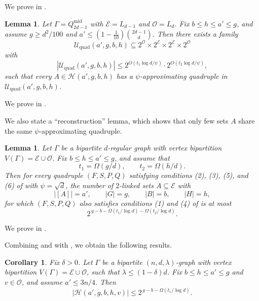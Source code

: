 \documentclass{amsart}
\newtheorem{cor}[thm]{Corollary}
\newtheorem{lem}[thm]{Lemma}
\theoremstyle{definition}
\newcommand{\cO}{\mathcal{O} }
\newcommand{\cE}{\mathcal{E} }
\newcommand{\beq}[1]{\begin{equation}\label{#1}}
\newcommand{\enq}[0]{\end{equation}}
\newcommand{\0}[0]{\emptyset}
\begin{document}
We prove  in .

\begin{lem}\label{prop:approx-quad-middle-layers}
Let $\Gamma=Q_{2d-1}^{\mathrm{mid}}$ with $\cE=L_{d-1}$ and $\cO=L_{d}$.
Fix $b\le h\le a'\le g$, and assume $g\ge d^2/100$ and $a'\leq (1-\frac{1}{10})\binom{2d-1}{d}$.
Then there exists a family
\[
\mathcal U_{\mathrm{quad}}(a',g,b,h)\subseteq 2^{\cO}\times 2^{\cE}\times 2^{\cE}\times 2^{\cO}
\]
with
\[
|\mathcal U_{\mathrm{quad}}(a',g,b,h)|
\le
2^{O(t_1\log d/\psi)}\cdot 2^{O(t_2\log d/\psi)},
\]
such that every $A\in \mathcal H(a',g,b,h)$ has a $\psi$-approximating quadruple in $\mathcal U_{\mathrm{quad}}(a',g,b,h)$.
\end{lem}

We prove  in .

We also state a ``reconstruction'' lemma, which shows that only few sets $A$ share the same $\psi$-approximating quadruple.

\begin{lem}\label{lem:reconstruction}
Let $\Gamma$ be a bipartite $d$-regular graph with vertex bipartition $V(\Gamma)=\cE\cup \cO$. Fix $b\le h\le a'\le g$, and assume that
\beq{eq:t}
t_1=\Omega(g/d),
\qquad
t_2=\Omega(h/d).
\enq
 Then for every quadruple $(F,S,P,Q)$ satisfying conditions (2), (3), (5), and (6) of  with $\psi=\sqrt d$, the number of $2$-linked sets $A\subseteq \cE$ with
\[
|[A]|=a',
\qquad
|G|=g,
\qquad
|B|=b,
\qquad
|H|=h,
\]
for which $(F,S,P,Q)$ also satisfies conditions (1) and (4) of  is at most
\[
2^{\,g-b- \Omega(t_1/\log d)- \Omega(t_2/\log d)}.
\]
\end{lem}

We prove  in .

Combining  and  with , we obtain the following results.

\begin{cor}\label{cor:H-spectral-expander}
Fix $\delta > 0$. Let $\Gamma$ be a bipartite $(n,d,\lambda)$-graph with vertex bipartition $V(\Gamma)=\cE\cup \cO$, such that $\lambda\le (1-\delta)d$.
Fix $b\le h\le a'\le g$ and $v\in \cO$, and assume $a'\le 3n/4$.
Then
\[
|\mathcal H(a',g,b,h,v)|
\le
2^{\,g-b-\Omega(t_1/\log d)}.
\]
\end{cor}
\end{document}
